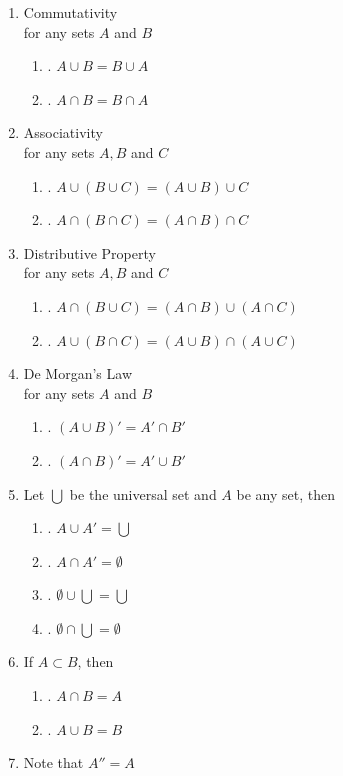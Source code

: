 \documentclass[11pt,a4paper]{article}
\begin{document}
\begin{enumerate}
\item Commutativity\\ for any sets $A$ and $B$
\begin{enumerate}
\item. $A\cup B=B\cup A$
\item. $A\cap B =B\cap A$
\end{enumerate}

\item Associativity\\ for any sets $A,B$ and $C$
\begin{enumerate}
\item. $A\cup (B\cup C ) = (A\cup B)\cup C$
\item. $A\cap (B\cap C) = (A\cap B)\cap C$
\end{enumerate}

\item Distributive Property\\ for any sets $A, B$ and $C$
\begin{enumerate}
\item. $A\cap (B\cup C) = (A\cap B) \cup (A\cap C)$
\item. $A\cup (B\cap C) = (A\cup B)\cap (A\cup C)$
\end{enumerate}





\pagebreak
\item De Morgan's Law\\ for any sets $A$ and $B$
\begin{enumerate}
\item. $(A\cup B)'=A'\cap B'$
\item. $(A\cap B)' = A'\cup B'$
\end{enumerate}

\item Let $\bigcup$ be the  universal set and $A$ be any set, then
\begin{enumerate}
\item. $A\cup A'=\bigcup$
\item. $A\cap A' = \emptyset$
\item. $\emptyset \cup \bigcup = \bigcup$
\item. $\emptyset \cap \bigcup =\emptyset$\\
\end{enumerate}

\item If $A\subset B$, then
\begin{enumerate}
\item. $A\cap B=A$
\item. $A\cup B=B$\\
\end{enumerate}

\item[$\bullet$] Note that $A''=A$\\
\end{enumerate}
\end{document}
